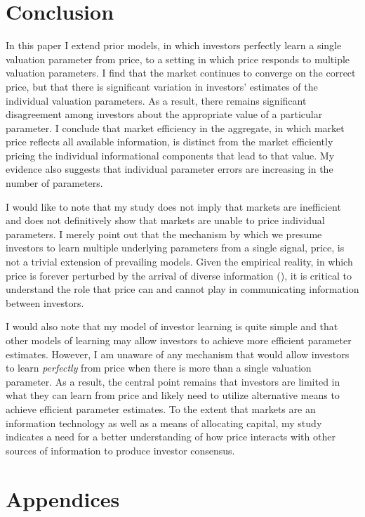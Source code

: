 \documentclass[11pt]{article}
\begin{document}
\section{Conclusion}
\label{sec:org4c7e24f}
In this paper I extend prior models, in which investors perfectly learn a single valuation parameter from price, to a setting in which price responds to multiple valuation parameters. I find that the market continues to converge on the correct price, but that there is significant variation in investors' estimates of the individual valuation parameters. As a result, there remains significant disagreement among investors about the appropriate value of a particular parameter. I conclude that market efficiency in the aggregate, in which market price reflects all available information, is distinct from the market efficiently pricing the individual informational components that lead to that value. My evidence also suggests that individual parameter errors are increasing in the number of parameters.

I would like to note that my study does not imply that markets are inefficient and does not definitively show that markets are unable to price individual parameters. I merely point out that the mechanism by which we presume investors to learn multiple underlying parameters from a single signal, price, is not a trivial extension of prevailing models. Given the empirical reality, in which price is forever perturbed by the arrival of diverse information (\citet{roll1988,leeMarketEfficiencyAccounting2001}), it is critical to understand the role that price can and cannot play in communicating information between investors.

I would also note that my model of investor learning is quite simple and that other models of learning may allow investors to achieve more efficient parameter estimates. However, I am unaware of any mechanism that would allow investors to learn \emph{perfectly} from price when there is more than a single valuation parameter. As a result, the central point remains that investors are limited in what they can learn from price and likely need to utilize alternative means to achieve efficient parameter estimates. To the extent that markets are an information technology as well as a means of allocating capital, my study indicates a need for a better understanding of how price interacts with other sources of information to produce investor consensus.

\singlespacing
\section{Appendices}
\label{sec:org4cc1d8d}
\end{document}
